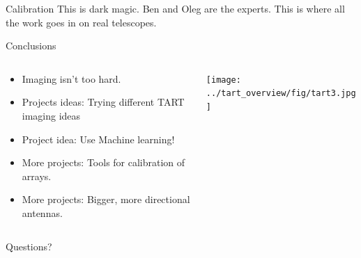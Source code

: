 \documentclass[ignorenonframetext]{beamer}
\begin{document}
\begin{frame}{Calibration}
 This is dark magic. Ben and Oleg are the experts. This is where all the work goes in on real telescopes.
\end{frame}
% 
% 



\begin{frame}{Conclusions}
 \begin{columns}
  \begin{column}{0.6\linewidth}
    \begin{itemize}
    \item Imaging isn't too hard.
    \item Projects ideas: Trying different TART imaging ideas
    \item Project idea: Use Machine learning!
    \item More projects: Tools for calibration of arrays.
    \item More projects: Bigger, more directional antennas.
    \end{itemize}
  \end{column}
  \begin{column}{0.4\linewidth}
    \texttt{[image: ../tart\_overview/fig/tart3.jpg]}
  \end{column}
\end{columns}
    \begin{block}{}
     \begin{center} Questions? \end{center}
    \end{block}

\end{frame}
\end{document}
